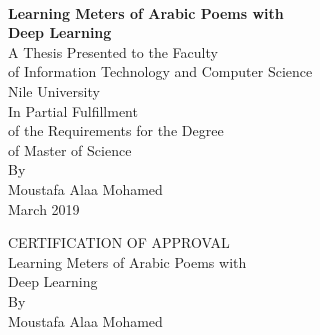 \thispagestyle{empty}
\begin{centering}
\large{\textbf{\\[1cm]{Learning Meters of Arabic Poems with \\ Deep Learning}}}\\[5cm]
\normalsize{}
A Thesis Presented to the Faculty\\
of Information Technology and Computer Science\\
Nile University\\[5cm]
In Partial Fulfillment\\
of the Requirements for the Degree\\
of Master of Science\\[3cm]
By\\
Moustafa Alaa Mohamed\\
March 2019\\
\end{centering}
\normalsize{}



\newpage 
\thispagestyle{empty}
\begin{centering}
\normalsize{}
CERTIFICATION OF APPROVAL\\[3cm]
Learning Meters of Arabic Poems with \\ Deep Learning\\[4cm]
 By\\
Moustafa Alaa Mohamed\\[4cm]
\end{centering}


